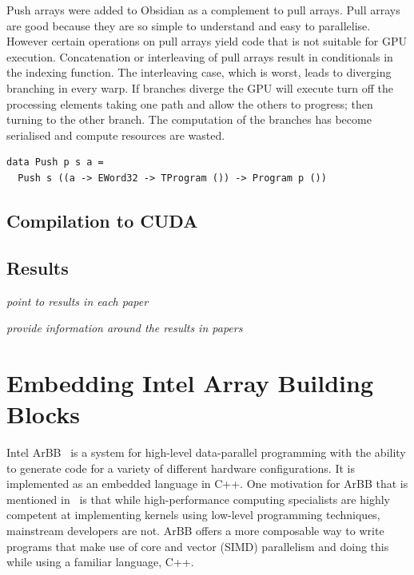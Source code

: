 \documentclass[a4paper]{book}
\begin{document}
Push arrays were added to Obsidian as a complement to pull arrays. Pull arrays are 
good because they are so simple to understand and easy to parallelise. However certain
operations on pull arrays yield code that is not suitable for GPU execution. Concatenation 
or interleaving of pull arrays result in conditionals in the indexing function. The 
interleaving case, which is worst, leads to diverging branching in every warp. If branches 
diverge the GPU will execute turn off the processing elements taking one path and 
allow the others to progress; then turning to the other branch. The computation of the 
branches has become serialised and compute resources are wasted. 

\begin{verbatim}
data Push p s a =
  Push s ((a -> EWord32 -> TProgram ()) -> Program p ())
\end{verbatim} 

\subsection{Compilation to CUDA}

\subsection{Results}

\emph{point to results in each paper} 

\emph{provide information around the results in papers}



%
%
\section{Embedding Intel Array Building Blocks} 

Intel ArBB~\citet{ARBB2011} is a system for high-level data-parallel programming with the 
ability to generate code for a variety of different hardware configurations. It is implemented 
as an embedded language in C++. One motivation for ArBB that is mentioned in~\citet{ARBB2011} is 
that while high-performance computing specialists are highly competent at implementing 
kernels using low-level programming techniques, mainstream developers are not. ArBB offers 
a more composable way to write programs that make use of core and vector (SIMD) parallelism and 
doing this while using a familiar language, C++.  
\end{document}
